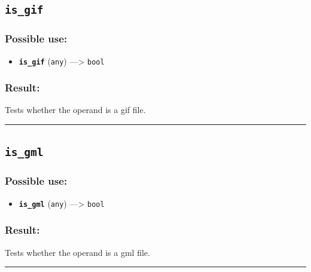 \documentclass[]{book}
\providecommand{\tightlist}{%
  \setlength{\itemsep}{0pt}\setlength{\parskip}{0pt}}
\theoremstyle{definition}
\theoremstyle{definition}
\theoremstyle{definition}
\theoremstyle{remark}
\begin{document}
\subsection{\texorpdfstring{\texttt{is\_gif}}{is\_gif}}\label{is_gif}

\subsubsection{Possible use:}\label{possible-use-291}

\begin{itemize}
\tightlist
\item
  \textbf{\texttt{is\_gif}} (\texttt{any}) ---\textgreater{}
  \texttt{bool}
\end{itemize}

\subsubsection{Result:}\label{result-281}

Tests whether the operand is a gif file.

\begin{center}\rule{0.5\linewidth}{\linethickness}\end{center}

\subsection{\texorpdfstring{\texttt{is\_gml}}{is\_gml}}\label{is_gml}

\subsubsection{Possible use:}\label{possible-use-292}

\begin{itemize}
\tightlist
\item
  \textbf{\texttt{is\_gml}} (\texttt{any}) ---\textgreater{}
  \texttt{bool}
\end{itemize}

\subsubsection{Result:}\label{result-282}

Tests whether the operand is a gml file.

\begin{center}\rule{0.5\linewidth}{\linethickness}\end{center}
\end{document}
